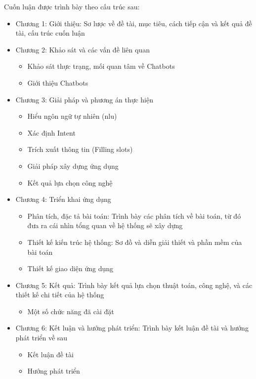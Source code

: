 Cuốn luận được trình bày theo cấu trúc sau:
\begin{itemize}
    \item Chương 1: Giới thiệu: Sơ lược về đề tài, mục tiêu, cách tiếp cận và kết quả đề tài, cấu trúc cuốn luận
    \item Chương 2: Khảo sát và các vấn đề liên quan
          \begin{itemize}
              \item Khảo sát thực trạng, mối quan tâm về Chatbots
              \item Giới thiệu Chatbots
          \end{itemize}
    \item Chương 3: Giải pháp và phương án thực hiện
          \begin{itemize}
              \item Hiểu ngôn ngữ tự nhiên (\ac{nlu})
              \item Xác định Intent
              \item Trích xuất thông tin (Filling slots)
              \item Giải pháp xây dựng ứng dụng
              \item Kết quả lựa chọn công nghệ
          \end{itemize}
    \item Chương 4: Triển khai ứng dụng
          \begin{itemize}
              \item Phân tích, đặc tả bài toán: Trình bày các phân tích về bài toán, từ đó đưa ra cái nhìn tổng quan về hệ thống sẽ xây dựng
              \item Thiết kế kiến trúc hệ thống: Sơ đồ và diễn giải thiết và phần mềm của bài toán
              \item Thiết kế giao diện ứng dụng
          \end{itemize}
    \item Chương 5: Kết quả: Trình bày kết quả lựa chọn thuật toán, công nghệ, và các thiết kế chi tiết của hệ thống
          \begin{itemize}
              \item Một số chức năng đã cài đặt
          \end{itemize}
    \item Chương 6: Kết luận và hướng phát triển: Trình bày kết luận đề tài và hướng phát triển về sau
          \begin{itemize}
              \item Kết luận đề tài
              \item Hướng phát triển
          \end{itemize}
\end{itemize}